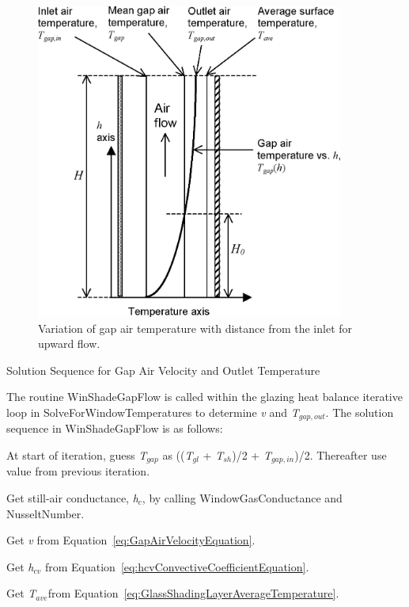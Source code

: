 \begin{figure}[hbtp] %
\centering
\includegraphics[width=0.9\textwidth, height=0.9\textheight, keepaspectratio=true]{media/image1687.png}
\caption{Variation of gap air temperature with distance from the inlet for upward flow. \protect \label{fig:variation-of-gap-air-temperature-with}}
\end{figure}

Solution Sequence for Gap Air Velocity and Outlet Temperature

The routine WinShadeGapFlow is called within the glazing heat balance iterative loop in SolveForWindowTemperatures to determine \emph{v} and \emph{T\(_{gap,out}\)}. The solution sequence in WinShadeGapFlow is as follows:

At start of iteration, guess \emph{T\(_{gap}\)} as ((\emph{T\(_{gl}\)} + \emph{T\(_{sh}\)})/2 + \emph{T\(_{gap,in}\)})/2. Thereafter use value from previous iteration.

Get still-air conductance, \emph{h\(_{c}\)}, by calling WindowGasConductance and NusseltNumber.

Get \emph{v} from Equation~\ref{eq:GapAirVelocityEquation}.

Get \emph{h\(_{cv}\)} from Equation~\ref{eq:hcvConvectiveCoefficientEquation}.

Get \emph{T\(_{ave}\)}from Equation~\ref{eq:GlassShadingLayerAverageTemperature}.

